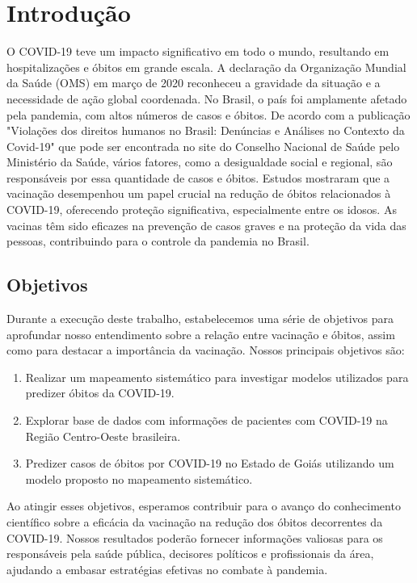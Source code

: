
\chapter{Introdução}
\label{cap:intro}

O COVID-19 teve um impacto significativo em todo o mundo, resultando em hospitalizações e óbitos em grande escala. A declaração da Organização Mundial da Saúde (OMS) em março de 2020 reconheceu a gravidade da situação e a necessidade de ação global coordenada. No Brasil, o país foi amplamente afetado pela pandemia, com altos números de casos e óbitos. De acordo com a publicação "Violações dos direitos humanos no Brasil: Denúncias e Análises no Contexto da Covid-19" que pode ser encontrada no site do Conselho Nacional de Saúde pelo Ministério da Saúde, vários fatores, como a desigualdade social e regional, são responsáveis por essa quantidade de casos e óbitos. Estudos mostraram que a vacinação desempenhou um papel crucial na redução de óbitos relacionados à COVID-19, oferecendo proteção significativa, especialmente entre os idosos. As vacinas têm sido eficazes na prevenção de casos graves e na proteção da vida das pessoas, contribuindo para o controle da pandemia no Brasil.

\section{Objetivos}

Durante a execução deste trabalho, estabelecemos uma série de objetivos para aprofundar nosso entendimento sobre a relação entre vacinação e óbitos, assim como para destacar a importância da vacinação. Nossos principais objetivos são:

\begin{enumerate}
    \item[1.] Realizar um mapeamento sistemático para investigar modelos utilizados para predizer óbitos da COVID-19. 
    \item[2.] Explorar base de dados com informações de pacientes com COVID-19 na Região Centro-Oeste brasileira.
    \item[3.] Predizer casos de óbitos por COVID-19 no Estado de Goiás utilizando um modelo proposto no mapeamento sistemático.
\end{enumerate}


Ao atingir esses objetivos, esperamos contribuir para o avanço do conhecimento científico sobre a eficácia da vacinação na redução dos óbitos decorrentes da COVID-19. Nossos resultados poderão fornecer informações valiosas para os responsáveis pela saúde pública, decisores políticos e profissionais da área, ajudando a embasar estratégias efetivas no combate à pandemia.


